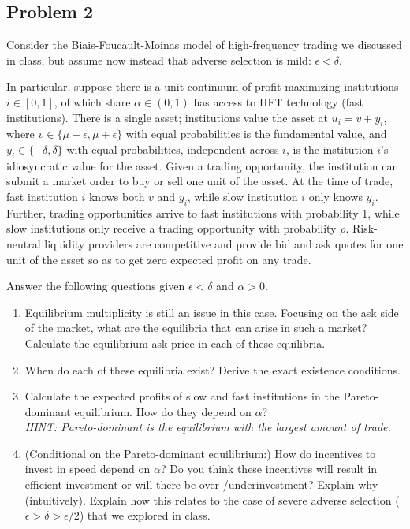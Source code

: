 \quad
\subsection*{Problem 2}
	Consider the Biais-Foucault-Moinas model of high-frequency trading we discussed in class, but assume now instead that adverse selection is mild: $\epsilon < \delta$. 
	
	In particular, suppose there is a unit continuum of profit-maximizing institutions $i \in [0,1]$, of which share $\alpha \in (0,1)$ has access to HFT technology (fast institutions). There is a single asset; institutions value the asset at $u_i = v+y_i$, where $v \in \{\mu-\epsilon, \mu+\epsilon\}$ with equal probabilities is the fundamental value, and $y_i \in \{-\delta, \delta\}$ with equal probabilities, independent across $i$, is the institution $i$'s idiosyncratic value for the asset. Given a trading opportunity, the institution can submit a market order to buy or sell one unit of the asset. At the time of trade, fast institution $i$ knows both $v$ and $y_i$, while slow institution $i$ only knows $y_i$. Further, trading opportunities arrive to fast institutions with probability 1, while slow institutions only receive a trading opportunity with probability $\rho$. Risk-neutral liquidity providers are competitive and provide bid and ask quotes for one unit of the asset so as to get zero expected profit on any trade.
	
	Answer the following questions given $\epsilon < \delta$ and $\alpha > 0$.
	\begin{enumerate}
		\item Equilibrium multiplicity is still an issue in this case. Focusing on the ask side of the market, what are the equilibria that can arise in such a market? Calculate the equilibrium ask price in each of these equilibria.
		
		\item When do each of these equilibria exist? Derive the exact existence conditions.
		
		\item Calculate the expected profits of slow and fast institutions in the Pareto-dominant equilibrium. How do they depend on $\alpha$? 
		\\
		\emph{HINT: Pareto-dominant is the equilibrium with the largest amount of trade.}
		
		\item (Conditional on the Pareto-dominant equilibrium:) How do incentives to invest in speed depend on $\alpha$? Do you think these incentives will result in efficient investment or will there be over-/underinvestment? Explain why (intuitively). Explain how this relates to the case of severe adverse selection ($\epsilon > \delta > \epsilon/2$) that we explored in class.
	\end{enumerate}



